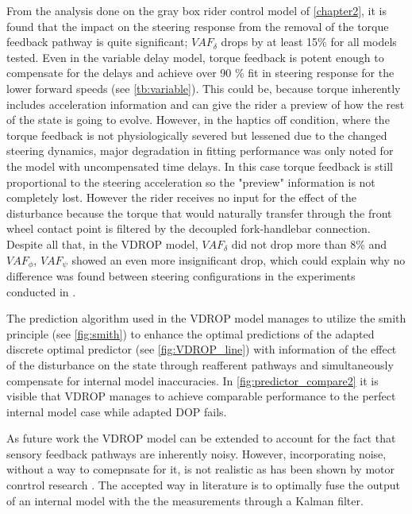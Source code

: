 From the analysis done on the gray box rider control model of \cref{chapter2}, it is found that  the impact on the steering response from the removal of the torque feedback pathway is quite significant; \ensuremath{\mathit{VAF}_\delta} drops by at least 15\% for all models tested. Even in the variable delay model, torque feedback is potent enough to compensate for the delays and achieve over 90 \% fit in steering response for the lower forward speeds (see \cref{tb:variable}). This could be, because torque inherently includes acceleration information and can give  the rider a preview of how the rest of the state is going to evolve. However, in the haptics off condition, where the torque feedback is not physiologically severed but lessened due to the changed steering dynamics, major  degradation in fitting performance was only noted for the model with uncompensated time delays. In this case torque feedback is still proportional to the steering acceleration so the "preview" information is not completely lost. However the rider receives no input for the effect of the disturbance because the torque that would naturally transfer through the front wheel contact point is filtered by the decoupled fork-handlebar connection.  Despite all that, in the VDROP model, \ensuremath{VAF_\delta} did not drop more than 8\% and \ensuremath{VAF_\phi}, \ensuremath{VAF_\psi} showed an even more insignificant drop, which could explain why no difference was found between steering configurations in the experiments conducted in \cite{dialynaseffect}. 

The  prediction algorithm used in the VDROP model  manages to utilize the smith  principle (see \cref{fig:smith}) to enhance the optimal  predictions of the adapted discrete optimal predictor (see \cref{fig:VDROP_line}) with  information of the effect of the disturbance on the state through reafferent pathways and simultaneously compensate for internal model inaccuracies. In \cref{fig:predictor_compare2} it is visible that VDROP manages to achieve comparable performance to the perfect internal model case while adapted DOP fails. 

As future work the VDROP model can be extended to account for the fact that sensory feedback pathways are inherently noisy. However, incorporating noise,  without a way to comepnsate for it, is not realistic as has been shown by motor conrtrol research \cite{wolpert1995internal}. The accepted way in literature is to optimally fuse the output of an internal model with the the measurements through a Kalman filter. 

